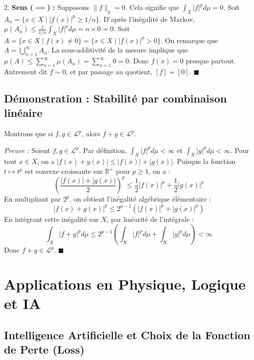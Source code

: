 \documentclass[11pt,a4paper]{article}
\begin{document}
2. \textbf{Sens ($\implies$) :} Supposons $\|f\|_p = 0$. Cela signifie que $\int_X |f|^p d\mu = 0$.
Soit $A_n = \{x \in X \mid |f(x)|^p \ge 1/n\}$.
D'après l'inégalité de Markov, $\mu(A_n) \le \frac{1}{1/n} \int_X |f|^p d\mu = n \times 0 = 0$.
Soit $A = \{x \in X \mid f(x) \neq 0\} = \{x \in X \mid |f(x)|^p > 0\}$.
On remarque que $A = \bigcup_{n=1}^\infty A_n$.
La sous-additivité de la mesure implique que $\mu(A) \le \sum_{n=1}^\infty \mu(A_n) = \sum_{n=1}^\infty 0 = 0$.
Donc $f(x) = 0$ presque partout. Autrement dit $f \sim 0$, et par passage au quotient, $[f] = [0]$. $\blacksquare$

\subsection{Démonstration : Stabilité par combinaison linéaire}

Montrons que si $f, g \in \mathcal{L}^p$, alors $f+g \in \mathcal{L}^p$.

\textit{Preuve :}
Soient $f, g \in \mathcal{L}^p$. Par définition, $\int_X |f|^p d\mu < \infty$ et $\int_X |g|^p d\mu < \infty$.
Pour tout $x \in X$, on a $|f(x) + g(x)| \le |f(x)| + |g(x)|$.
Puisque la fonction $t \mapsto t^p$ est convexe croissante sur $\mathbb{R}^+$ pour $p \ge 1$, on a :
$$ \left( \frac{|f(x)| + |g(x)|}{2} \right)^p \le \frac{1}{2} |f(x)|^p + \frac{1}{2} |g(x)|^p $$
En multipliant par $2^p$, on obtient l'inégalité algébrique élémentaire :
$$ |f(x) + g(x)|^p \le 2^{p-1} \left( |f(x)|^p + |g(x)|^p \right) $$
En intégrant cette inégalité sur $X$, par linéarité de l'intégrale :
$$ \int_X |f+g|^p d\mu \le 2^{p-1} \left( \int_X |f|^p d\mu + \int_X |g|^p d\mu \right) < \infty $$
Donc $f+g \in \mathcal{L}^p$. $\blacksquare$

\section{Applications en Physique, Logique et IA}

\subsection{Intelligence Artificielle et Choix de la Fonction de Perte (Loss)}
\end{document}
